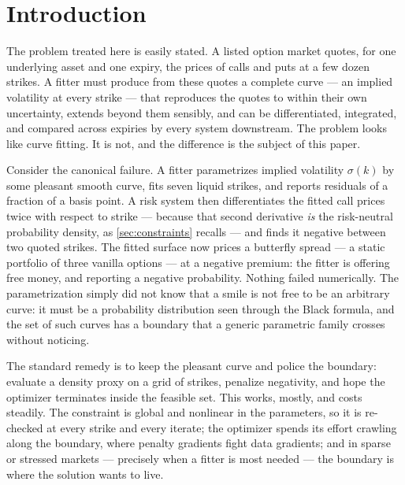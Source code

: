 \section{Introduction}
\label{sec:intro}

The problem treated here is easily stated.  A listed option market quotes,
for one underlying asset and one expiry, the prices of calls and puts at a
few dozen strikes.  A fitter must produce from these quotes a complete curve
--- an implied volatility at every strike --- that reproduces the quotes to
within their own uncertainty, extends beyond them sensibly, and can be
differentiated, integrated, and compared across expiries by every system
downstream.  The problem looks like curve fitting.  It is not, and the
difference is the subject of this paper.

Consider the canonical failure.  A fitter parametrizes implied volatility
$\sigma(k)$ by some pleasant smooth curve, fits seven liquid strikes, and
reports residuals of a fraction of a basis point.  A risk system then
differentiates the fitted call prices twice with respect to strike ---
because that second derivative \emph{is} the risk-neutral probability
density, as \cref{sec:constraints} recalls --- and finds it negative between
two quoted strikes.  The fitted surface now prices a butterfly spread --- a
static portfolio of three vanilla options --- at a negative premium: the
fitter is offering free money, and reporting a negative probability.
Nothing failed numerically.  The parametrization simply did not know that a
smile is not free to be an arbitrary curve: it must be a probability
distribution seen through the Black formula, and the set of such curves has
a boundary that a generic parametric family crosses without noticing.

The standard remedy is to keep the pleasant curve and police the boundary:
evaluate a density proxy on a grid of strikes, penalize negativity, and hope
the optimizer terminates inside the feasible set.  This works, mostly, and
costs steadily.  The constraint is global and nonlinear in the parameters,
so it is re-checked at every strike and every iterate; the optimizer spends
its effort crawling along the boundary, where penalty gradients fight data
gradients; and in sparse or stressed markets --- precisely when a fitter is
most needed --- the boundary is where the solution wants to live.


